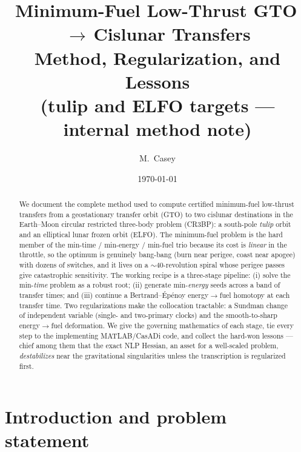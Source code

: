 \documentclass[11pt]{article}
\title{\bfseries Minimum-Fuel Low-Thrust GTO\,$\rightarrow$\,Cislunar Transfers\\[2pt]
       \large Method, Regularization, and Lessons\\[6pt]
       \normalsize (tulip and ELFO targets --- internal method note)}
\author{M.\ Casey}
\date{\today}
\begin{document}
\maketitle

\begin{abstract}
\noindent
We document the complete method used to compute certified minimum-fuel
low-thrust transfers from a geostationary transfer orbit (GTO) to two cislunar
destinations in the Earth--Moon circular restricted three-body problem (CR3BP):
a south-pole \emph{tulip} orbit and an elliptical lunar frozen orbit (ELFO).
The minimum-fuel problem is the hard member of the min-time / min-energy /
min-fuel trio because its cost is \emph{linear} in the throttle, so the optimum
is genuinely bang-bang (burn near perigee, coast near apogee) with dozens of
switches, and it lives on a $\sim$40-revolution spiral whose perigee passes
give catastrophic sensitivity. The working recipe is a three-stage pipeline:
(i) solve the min-\emph{time} problem as a robust root; (ii) generate
min-\emph{energy} seeds across a band of transfer times; and (iii) continue a
Bertrand--\'Ep\'enoy energy$\rightarrow$fuel homotopy at each transfer time.
Two regularizations make the collocation tractable: a Sundman change of
independent variable (single- and two-primary clocks) and the smooth-to-sharp
energy$\rightarrow$fuel deformation. We give the governing mathematics of each
stage, tie every step to the implementing MATLAB/CasADi code, and collect the
hard-won lessons --- chief among them that the exact NLP Hessian, an asset for a
well-scaled problem, \emph{destabilizes} near the gravitational singularities
unless the transcription is regularized first.
\end{abstract}

\tableofcontents

\section{Introduction and problem statement}\label{sec:intro}
\end{document}
